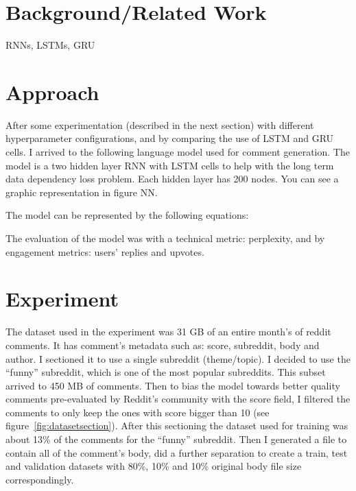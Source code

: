 \documentclass{article} %
\begin{document}


\section{Background/Related Work}
RNNs, LSTMs, GRU

\section{Approach}
After some experimentation (described in the next section) with different
hyperparameter configurations, and by comparing the use of LSTM and GRU cells. I
arrived to the following language model used for comment generation. The model
is a two hidden layer RNN with LSTM cells to help with the long term data
dependency loss problem. Each hidden layer has 200 nodes. You can see a graphic
representation in figure NN.


The model can be represented by the following equations:


The evaluation of the model was with a technical metric: perplexity, and by
engagement metrics: users' replies and upvotes.

\section{Experiment}
The dataset used in the experiment was 31 GB of an entire month's of reddit
comments. It has comment's metadata such as: score, subreddit, body and author.
I sectioned it to use a single subreddit (theme/topic). I decided to use the
``funny'' subreddit, which is one of the most popular subreddits. This subset
arrived to 450 MB of comments. Then to bias the model towards better quality
comments pre-evaluated by Reddit's community with the score field, I filtered
the comments to only keep the ones with score bigger than 10 (see
figure~\ref{fig:datasetsection}).  After this sectioning the dataset used for
training was about 13\% of the comments for the ``funny'' subreddit. Then I
generated a file to contain all of the comment's body, did a further separation
to create a train, test and validation datasets with 80\%, 10\% and 10\%
original body file size correspondingly.
\end{document}

